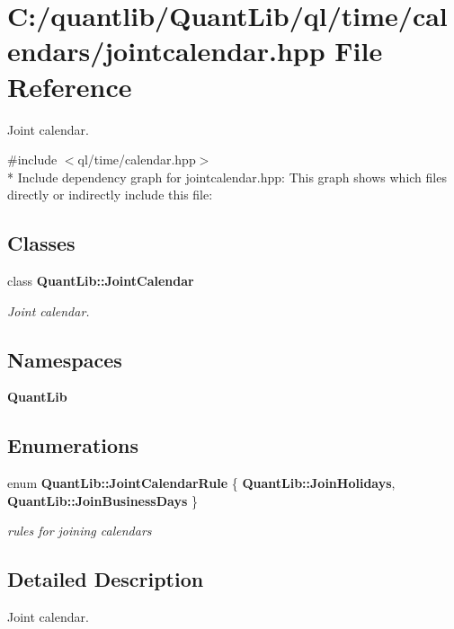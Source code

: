 \section{C\+:/quantlib/\+Quant\+Lib/ql/time/calendars/jointcalendar.hpp File Reference}
\label{jointcalendar_8hpp}


Joint calendar.  


{\ttfamily \#include $<$ql/time/calendar.\+hpp$>$}\\*
Include dependency graph for jointcalendar.\+hpp\+:
This graph shows which files directly or indirectly include this file\+:
\subsection*{Classes}
\begin{DoxyCompactItemize}
\item 
class {\bf Quant\+Lib\+::\+Joint\+Calendar}
\begin{DoxyCompactList}\small\item\em Joint calendar. \end{DoxyCompactList}\end{DoxyCompactItemize}
\subsection*{Namespaces}
\begin{DoxyCompactItemize}
\item 
 {\bf Quant\+Lib}
\end{DoxyCompactItemize}
\subsection*{Enumerations}
\begin{DoxyCompactItemize}
\item 
enum {\bf Quant\+Lib\+::\+Joint\+Calendar\+Rule} \{ {\bf Quant\+Lib\+::\+Join\+Holidays}, 
{\bf Quant\+Lib\+::\+Join\+Business\+Days}
 \}\begin{DoxyCompactList}\small\item\em rules for joining calendars \end{DoxyCompactList}
\end{DoxyCompactItemize}


\subsection{Detailed Description}
Joint calendar. 


